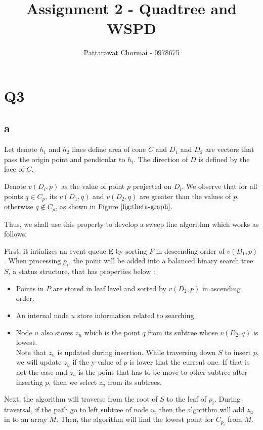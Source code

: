 \documentclass[12pt]{article}
\begin{document}
\title{Assignment 2 - Quadtree and WSPD}
\author{
	Pattarawat Chormai - 0978675 \\
}
\maketitle

\section*{Q3}

\subsection*{a}

Let denote $h_1$ and $h_2$ lines define area of cone $C$ and $D_1$ and $D_2$
are vectors that pass the origin point and pendicular to $h_i$. The direction
of $D$ is defined by the face of $C$.

Denote $v(D_i,p)$ as the value of point $p$ projected on $D_i$. We observe that for
all points $q \in C_p$, its $v(D_1,q)$ and $v(D_2,q)$ are greater than
the values of $p$, otherwise $q \notin C_p$, as shown in Figure $\ref{fig:theta-graph}$.

Thus, we shall use this property to develop a sweep line algorithm which works
as follows:

First, it intializes an event queue E by sorting $P$ in descending order of $v(D_1,p)$.
When processing $p_i$, the point will be added into a balanced binary search tree $S$, a status structure,
that has properties below :
\begin{itemize}
    \item Points in $P$ are stored in leaf level and sorted by $v(D_2,p)$ in ascending order.
    \item An internal node $u$ store information related to searching.
    \item Node $u$ also stores $z_u$ which is the point $q$ from its subtree whose $v(D_2,q)$ is lowest. \\
        \;\; \; \; Note that $z_u$ is updated during insertion.
        While traversing down $S$ to insert $p$, we will update $z_u$ if the y-value of $p$ is lower that the current one.
        If that is not the case and $z_u$ is the point that has to be move to other subtree after inserting
        $p$, then we select $z_u$ from its subtrees.
\end{itemize}

Next, the algorithm will traverse from the root of $S$ to the leaf of $p_i$. During traversal,
if the path go to left subtree of node $u$, then the algorithm will add $z_u$ in to an array $M$.
Then, the algorithm will find the lowest point for $C_{p_i}$ from $M$.
\end{document}
